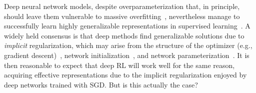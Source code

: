 %


Deep neural network models, despite overparameterization that, in principle, should leave them vulnerable to massive overfitting~\citep{arora2018optimization,arora2019implicit},
nevertheless manage to successfully learn highly generalizable representations in supervised learning~\citep{arora2018optimization,gunasekar2018implicit,arora2019implicit}.
A widely held consensus is that deep methods find generalizable solutions due to \emph{implicit} regularization, which may arise from the structure of the optimizer (e.g., gradient descent)~\citep{blanc2020implicit}, network initialization~\citep{woodworth2020kernel}, and network parameterization~\citep{arora2018optimization,gunasekar2017implicit,wei2019regularization}. It is then reasonable to expect that deep RL will work well for the same reason, acquiring effective representations due to the implicit regularization enjoyed by deep networks trained with SGD. But is this actually the case? 

